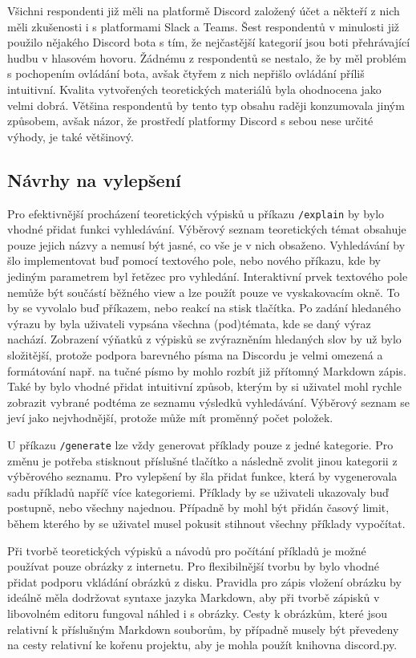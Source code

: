 \documentclass[FM]{tulthesis}
\begin{document}
	Všichni respondenti již měli na platformě Discord založený účet a někteří z nich měli zkušenosti i s platformami Slack a Teams. Šest respondentů v minulosti již použilo nějakého Discord bota s tím, že nejčastější kategorií jsou boti přehrávající hudbu v hlasovém hovoru. Žádnému z respondentů se nestalo, že by měl problém s pochopením ovládání bota, avšak čtyřem z nich nepřišlo ovládání příliš intuitivní. Kvalita vytvořených teoretických materiálů byla ohodnocena jako velmi dobrá. Většina respondentů by tento typ obsahu raději konzumovala jiným způsobem, avšak názor, že prostředí platformy Discord s sebou nese určité výhody, je také většinový.
	
	\subsection{Návrhy na vylepšení}
	
	Pro efektivnější procházení teoretických výpisků u příkazu \verb|/explain| by bylo vhodné přidat funkci vyhledávání. Výběrový seznam teoretických témat obsahuje pouze jejich názvy a nemusí být jasné, co vše je v nich obsaženo. Vyhledávání by šlo implementovat buď pomocí textového pole, nebo nového příkazu, kde by jediným parametrem byl řetězec pro vyhledání. Interaktivní prvek textového pole nemůže být součástí běžného view a lze použít pouze ve vyskakovacím okně. To by se vyvolalo buď příkazem, nebo reakcí na stisk tlačítka. Po zadání hledaného výrazu by byla uživateli vypsána všechna (pod)témata, kde se daný výraz nachází. Zobrazení výňatků z výpisků se zvýrazněním hledaných slov by už bylo složitější, protože podpora barevného písma na Discordu je velmi omezená a formátování např. na tučné písmo by mohlo rozbít již přítomný Markdown zápis. Také by bylo vhodné přidat intuitivní způsob, kterým by si uživatel mohl rychle zobrazit vybrané podtéma ze seznamu výsledků vyhledávání. Výběrový seznam se jeví jako nejvhodnější, protože může mít proměnný počet položek.
	
	U příkazu \verb|/generate| lze vždy generovat příklady pouze z jedné kategorie. Pro změnu je potřeba stisknout příslušné tlačítko a následně zvolit jinou kategorii z výběrového seznamu. Pro vylepšení by šla přidat funkce, která by vygenerovala sadu příkladů napříč více kategoriemi. Příklady by se uživateli ukazovaly buď postupně, nebo všechny najednou. Případně by mohl být přidán časový limit, během kterého by se uživatel musel pokusit stihnout všechny příklady vypočítat.
	
	Při tvorbě teoretických výpisků a návodů pro počítání příkladů je možné \mbox{používat} pouze obrázky z internetu. Pro flexibilnější tvorbu by bylo vhodné přidat podporu vkládání obrázků z disku. Pravidla pro zápis vložení obrázku by ideálně měla dodržovat syntaxe jazyka Markdown, aby při tvorbě zápisků v libovolném editoru fungoval náhled i s obrázky. Cesty k obrázkům, které jsou relativní k příslušným Markdown souborům, by případně musely být převedeny na cesty relativní ke kořenu projektu, aby je mohla použít knihovna discord.py.
	
\end{document}
